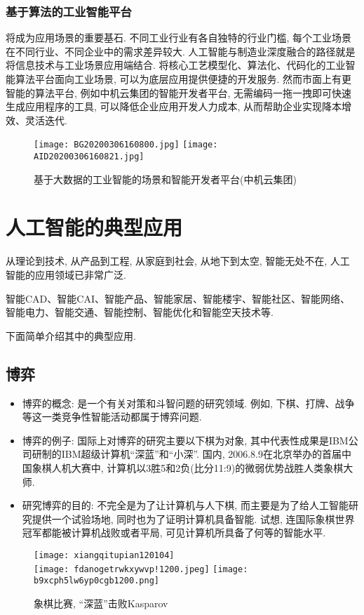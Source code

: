 \subsubsection{基于算法的工业智能平台}

将成为应用场景的重要基石.
不同工业行业有各自独特的行业门槛, 每个工业场景在不同行业、不同企业中的需求差异较大.
人工智能与制造业深度融合的路径就是将信息技术与工业场景应用端结合.
将核心工艺模型化、算法化、代码化的工业智能算法平台面向工业场景, 可以为底层应用提供便捷的开发服务.
然而市面上有更智能的算法平台, 例如中机云集团的智能开发者平台, 无需编码一拖一拽即可快速生成应用程序的工具, 可以降低企业应用开发人力成本, 从而帮助企业实现降本增效、灵活迭代.
\begin{figure}[htbp]
	\centering
	\texttt{[image: BG20200306160800.jpg]}
	\texttt{[image: AID20200306160821.jpg]}
	\caption{基于大数据的工业智能的场景和智能开发者平台(中机云集团)}
   \label{AI:Fig4}
\end{figure}


\section{人工智能的典型应用  }
从理论到技术, 从产品到工程, 从家庭到社会, 从地下到太空, 智能无处不在, 人工智能的应用领域已非常广泛.
\begin{example}
    智能CAD、智能CAI、智能产品、智能家居、智能楼宇、智能社区、智能网络、智能电力、智能交通、智能控制、智能优化和智能空天技术等.
\end{example}

下面简单介绍其中的典型应用.
\subsection{\textbf{博弈}}
\begin{itemize}
\item 博弈的概念: 是一个有关对策和斗智问题的研究领域. 例如, 下棋、打牌、战争等这一类竞争性智能活动都属于博弈问题.
\item 博弈的例子: 国际上对博弈的研究主要以下棋为对象, 其中代表性成果是IBM公司研制的IBM超级计算机“深蓝”和“小深”. 国内, 2006.8.9在北京举办的首届中国象棋人机大赛中, 计算机以3胜5和2负(比分11:9)的微弱优势战胜人类象棋大师.
\item 研究博弈的目的: 不完全是为了让计算机与人下棋, 而主要是为了给人工智能研究提供一个试验场地, 同时也为了证明计算机具备智能.
试想, 连国际象棋世界冠军都能被计算机战败或者平局, 可见计算机所具备了何等的智能水平.
\end{itemize}
\begin{figure}[htbp]
	\centering
	\texttt{[image: xiangqitupian120104]}\\
    \texttt{[image: fdanogetrwkxywvp!1200.jpeg]}
    \texttt{[image: b9xcph5lw6yp0cgb1200.png]}
	\caption{象棋比赛,  “深蓝”击败Kasparov}
   \label{AI:Fig4}
\end{figure}
